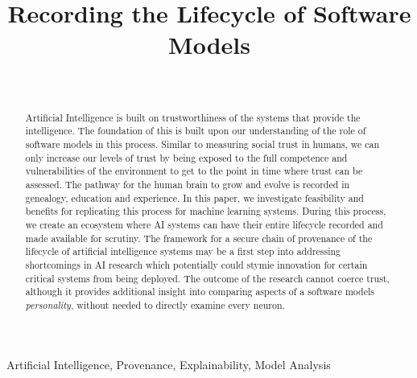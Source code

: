 \documentclass[twocolumn,twoside]{IEEEtran}
\begin{document}

\lstset{style=mystyle}



\title{
Recording the Lifecycle of Software Models
}

\author{\\

}

\maketitle

\begin{abstract}
Artificial Intelligence is built on trustworthiness of the systems that provide the intelligence. The foundation of this is built upon our understanding of the role of software models in this process. Similar to measuring social trust in humans, we can only increase our levels of trust by being exposed to the full competence and vulnerabilities of the environment to get to the point in time where trust can be assessed. The pathway for the human brain to grow and evolve is recorded in genealogy, education and experience. In this paper, we investigate feasibility and benefits for replicating this process for machine learning systems. During this process, we create an ecosystem where AI systems can have their entire lifecycle recorded and made available for scrutiny. The framework for a secure chain of provenance of the lifecycle of artificial intelligence systems may be a first step into addressing shortcomings in AI research which potentially could stymie innovation for certain critical systems from being deployed. The outcome of the research cannot coerce trust, although it provides additional insight into comparing aspects of a software models \textit{personality}, without needed to directly examine every neuron. 
\end{abstract}

\begin{IEEEkeywords}
Artificial Intelligence, Provenance, Explainability, Model Analysis\end{IEEEkeywords}













\end{document}
